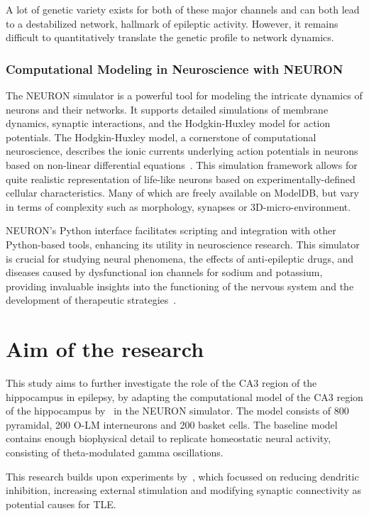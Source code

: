 A lot of genetic variety exists for both of these major channels and can both lead to a destabilized network, hallmark of epileptic activity.
However, it remains difficult to quantitatively translate the genetic profile to network dynamics.

\subsubsection{Computational Modeling in Neuroscience with NEURON}
The NEURON simulator is a powerful tool for modeling the intricate dynamics
of neurons and their networks. It supports detailed simulations of membrane
dynamics, synaptic interactions, and the Hodgkin-Huxley model for action
potentials. The Hodgkin-Huxley model, a cornerstone of computational neuroscience,
describes the ionic currents underlying action potentials in neurons based
on non-linear differential equations~\parencite{hodgkinMeasurementCurrentvoltageRelations1952}.
This simulation framework allows for quite realistic representation of life-like neurons based
on experimentally-defined cellular characteristics. Many of which are freely available on ModelDB,
but vary in terms of complexity such as morphology, synapses or 3D-micro-environment.

NEURON's Python interface facilitates scripting and integration
with other Python-based tools, enhancing its utility in neuroscience research.
This simulator is crucial for studying neural phenomena, the effects of
anti-epileptic drugs, and diseases caused by dysfunctional ion channels for sodium and potassium,
providing invaluable insights into the functioning of the nervous system
and the development of therapeutic strategies~\parencite{miglioreParallelNetworkSimulations2006}.
\pagebreak
\section{Aim of the research}
This study aims to further investigate the role of the CA3 region of the hippocampus in epilepsy,
by adapting the computational model of the CA3 region of the hippocampus by~\textcite{neymotinKetamineDisruptsTheta2011} in the NEURON simulator.
The model consists of 800 pyramidal, 200 O-LM interneurons and 200 basket cells.
The baseline model contains enough biophysical detail to replicate homeostatic neural activity, consisting of theta-modulated gamma oscillations.

This research builds upon experiments by~\textcite{sanjayImpairedDendriticInhibition2015},
which focussed on reducing dendritic inhibition, increasing external stimulation and modifying synaptic connectivity as potential causes for TLE\@.

